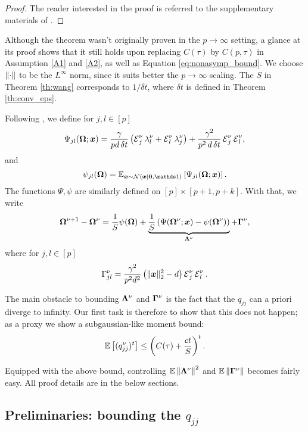 \begin{theorem} 
\begin{proof}
The reader interested in the proof is referred to the supplementary materials of \cite{wang_2018,wang_2019}.
\end{proof}

\end{theorem}

Although the theorem wasn't originally proven in the $p \to \infty$ setting, a glance at its proof shows that it still holds upon replacing $C(\tau)$ by $C(p, \tau)$ in Assumption \ref{A1} and \ref{A2}, as well as Equation \eqref{eq:nonasymp_bound}. We choose $\norm{\cdot}$ to be the $L^\infty$ norm, since it suits better the $p \to \infty$ scaling. The $S$ in Theorem \ref{th:wang} corresponds to $1 / \delta t$, where $\delta t$ is defined in Theorem \ref{th:conv_eps}.

Following \cite{wang_2018}, we define for $j, l \in [p]$
\[ \Psi_{jl}(\bm{\Omega}; \bm{x}) = \frac{\gamma}{pd \, \delta t} \left( \operatorname{{\cal E}}_{j}^\nu \lambda_{l}^\nu  + \operatorname{{\cal E}}_{l}^\nu \lambda_{j}^\nu  \right)+ \frac{\gamma^2 }{p^2\,d\, \delta t}\operatorname{{\cal E}}_{j}^\nu \operatorname{{\cal E}}_{l}^\nu, \]
and
\[ \psi_{jl}(\Om) = \Expxgauss\left[ \Psi_{jl}(\Om; \x ) \right]. \]
The functions $\Psi, \psi$ are similarly defined on $[p] \times [p+1, p+k]$. With that, we write
\[ \bm{\Omega}^{\nu+1} - \bm{\Omega}^\nu = \frac1S \psi(\bm{\Omega}) + \underbrace{\frac1S\left(\Psi(\bm{\Omega}^\nu; \bm{x} ) - \psi(\bm{\Omega}^\nu)\right)}_{\bm\Lambda^\nu} + \bm\Gamma^\nu, \]
where for $j, l \in [p]$
\[ \Gamma^\nu_{jl} = \frac{\gamma^2}{p^2d^2} \left( \lVert \bm{x} \rVert_2^2 - d\right) \operatorname{{\cal E}}_j^\nu\operatorname{{\cal E}}_l^\nu. \]

The main obstacle to bounding $\bm\Lambda^\nu$ and $\bm \Gamma^\nu$ is the fact that the $q_{jj}$ can a priori diverge to infinity. Our first task is therefore to show that this does not happen; as a proxy we show a subgaussian-like moment bound:
\[ \operatorname{\mathbb{E}}\left[(q_{jj}^\nu)^t\right] \leq \left(C(\tau) + \frac{c t}{S}\right)^t. \]

Equipped with the above bound, controlling 
$ \operatorname{\mathbb{E}} \norm{ \bm{\Lambda}^\nu }^{2} $
and
$\operatorname{\mathbb{E}}  \norm{ \bm{\Gamma}^\nu  } $ 
becomes fairly easy. All proof details are in the below sections.

\subsection{Preliminaries: bounding the \texorpdfstring{$q_{jj}$}{qjj}}

